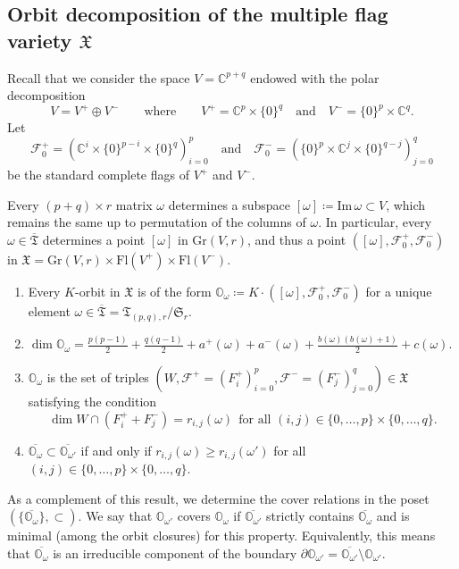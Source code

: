 \documentclass[ALCO,Unicode]{cedram}
\newcommand{\flag}{\mathcal{F}}
\newcommand{\Xorbit}{\mathbb{O}}
\newcommand{\permutationsof}[1]{\mathfrak{S}_{#1}}
\newcommand{\ppermutationsof}{\mathfrak{T}}
\newcommand{\parameters}{\overline{\ppermutationsof}}
\newcommand{\Xfv}{\mathfrak{X}}
\newcommand{\Grass}{\mathrm{Gr}}
\newcommand{\Flags}{\mathrm{Fl}}
\newcommand{\mC}{\mathbb{C}}
\begin{document}
\subsection{Orbit decomposition of the multiple flag variety $\Xfv$}

\label{section-2.2}

Recall that we consider the space $V=\mC^{p+q}$ endowed with the polar decomposition
\[V=V^+\oplus V^-\qquad\mbox{where}\qquad V^+=\mC^p\times\{0\}^q\quad\mbox{and}\quad V^-=\{0\}^p\times \mC^q.\]
Let
\[
\flag_0^+=(\mC^i\times\{0\}^{p-i}\times\{0\}^q)_{i=0}^p
\quad\mbox{and}\quad
\flag_0^-=(\{0\}^{p}\times\mC^j\times\{0\}^{q-j})_{j=0}^q
\]
be the standard complete flags of $V^+$ and $V^-$.

Every  $(p+q)\times r$ matrix $\omega$ determines a subspace $[\omega]\coloneqq \mathrm{Im}\,\omega\subset V$, which remains the same up to permutation of the columns of $\omega$.
In particular, every $\omega\in\parameters$ determines a point $[\omega]$ in $\Grass(V,r)$, and thus a point $([\omega],\flag_0^+,\flag_0^-)$ in $\Xfv=\Grass(V,r)\times\Flags(V^+)\times\Flags(V^-)$.

\begin{theorem}
\begin{enumerate}[label=(\arabic*)]
\item\label{Tp11} Every $K$-orbit in $\Xfv$ is of the form $\Xorbit_\omega\coloneqq K\cdot([\omega],\flag_0^+,\flag_0^-)$ for a unique element $\omega\in\parameters=\ppermutationsof_{(p,q),r}/\permutationsof{r}$.
\item \label{Tp12} $\dim\Xorbit_\omega=\frac{p(p-1)}{2}+\frac{q(q-1)}{2}+a^+(\omega)+a^-(\omega)+\frac{b(\omega)(b(\omega)+1)}{2}+c(\omega)$.
\item \label{Tp13} $\Xorbit_\omega$ is the set of triples $(W,\flag^+=(F^+_i)_{i=0}^p,\flag^-=(F_j^-)_{j=0}^q)\in\Xfv$
satisfying the condition
\[\dim W\cap(F_i^++F_j^-)=r_{i,j}(\omega)\ \ \mbox{for all $(i,j)\in\{0,\ldots,p\}\times\{0,\ldots,q\}$}.\]
 \item \label{Tp14} $\overline{\Xorbit_\omega}\subset\overline{\Xorbit_{\omega'}}$ if and only if $r_{i,j}(\omega)\geq r_{i,j}(\omega')$ for all $(i,j)\in\{0,\ldots,p\}\times\{0,\ldots,q\}$.
\end{enumerate}
\label{Tp1}
\end{theorem}

As a complement of this result, we determine the cover relations in the poset $(\{\overline{\Xorbit_\omega}\},\subset)$. We say that $\Xorbit_{\omega'}$ covers $\Xorbit_\omega$ if $\overline{\Xorbit_{\omega'}}$ strictly contains $\overline{\Xorbit_\omega}$ and is minimal (among the orbit closures) for this property.
Equivalently, this means that $\overline{\Xorbit_\omega}$ is an irreducible component of the boundary
$\partial\Xorbit_{\omega'}=\overline{\Xorbit_{\omega'}}\setminus \Xorbit_{\omega'}$.
\end{document}
